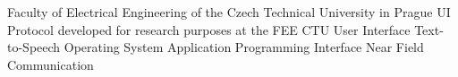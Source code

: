  Faculty of Electrical Engineering of the Czech Technical University in Prague
\abbrv[UIP]  UI Protocol developed for research purposes at the FEE CTU
\abbrv[UI]  User Interface
\abbrv[TTS]  Text-to-Speech
\abbrv[OS]  Operating System
\abbrv[API]  Application Programming Interface
\abbrv[NFC]  Near Field Communication
\stopAbbreviations

\endinput
